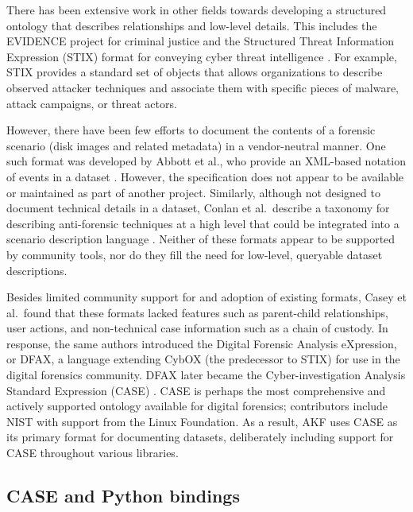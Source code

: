 There has been extensive work in other fields towards developing a
structured ontology that describes relationships and low-level details.
This includes the EVIDENCE project for criminal justice and the
Structured Threat Information Expression (STIX) format for conveying
cyber threat intelligence
\cite{caseyLeveragingCybOXStandardize2015}. For example, STIX
provides a standard set of objects that allows organizations to describe
observed attacker techniques and associate them with specific pieces of
malware, attack campaigns, or threat actors.

However, there have been few efforts to document the contents of a
forensic scenario (disk images and related metadata) in a vendor-neutral
manner. One such format was developed by Abbott et al., who provide an
XML-based notation of events in a dataset
\cite{abbottAutomatedRecognitionEvent2006}. However, the
specification does not appear to be available or maintained as part of
another project. Similarly, although not designed to document technical
details in a dataset, Conlan et al.~describe a taxonomy for describing
anti-forensic techniques at a high level that could be integrated into a
scenario description language
\cite{conlanAntiforensicsFurtheringDigital2016}. Neither of these
formats appear to be supported by community tools, nor do they fill the
need for low-level, queryable dataset descriptions.

Besides limited community support for and adoption of existing formats,
Casey et al.~found that these formats lacked features such as
parent-child relationships, user actions, and non-technical case
information such as a chain of custody. In response, the same authors
introduced the Digital Forensic Analysis eXpression, or DFAX, a language
extending CybOX (the predecessor to STIX) for use in the digital
forensics community. DFAX later became the Cyber-investigation Analysis
Standard Expression (CASE)
\cite{caseyAdvancingCoordinatedCyberinvestigations2017}. CASE is
perhaps the most comprehensive and actively supported ontology available
for digital forensics; contributors include NIST with support from the
Linux Foundation. As a result, AKF uses CASE as its primary format for
documenting datasets, deliberately including support for CASE throughout
various libraries.

\subsection{CASE and Python
bindings}\label{case-and-python-bindings}

